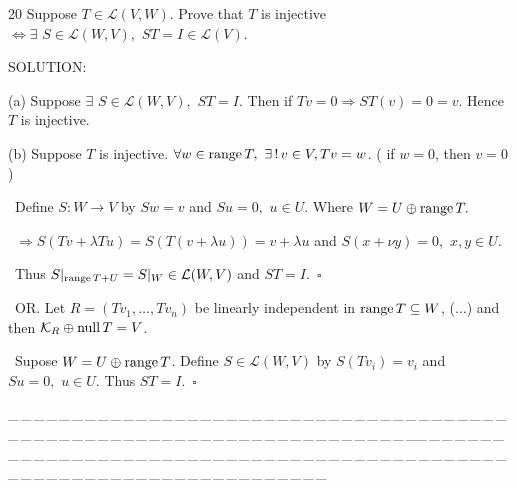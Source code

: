 \documentclass[a4paper, 11pt, UTF8]{article}
\def\range{\textup{range}\,}
\def\null{\textup{null\,}}
\def\Lm{\mathcal{L}}
\begin{document}
\begin{large}
{\timesbf\Large 20} {\timessl\Large 
Suppose $T\in\Lm(V, W)$. Prove that $T$ is injective $\Longleftrightarrow\exists\,\,S\in\Lm(W, V),\,\,ST=I\in\Lm(V)$.}\par
{\timesbf S\footnotesize{OLUTION:}}\par\quad
(a) Suppose $\exists\,\,S\in\Lm(W, V),\,\,ST=I$. Then if $Tv=0\Rightarrow ST(v)=0=v.$ Hence $T$ is injective.\par\quad
(b) Suppose $T$ is injective. $\forall w\in\range T,\,\,\exists\,!\,v\in V,Tv=w$. ( if $w=0$, then $v=0$ )\par\qquad\,
Define $S:W\rightarrow V$ by $Sw=v$ and $Su=0,\,\,u\in U$. Where $W=U\oplus\range T.$\par\qquad\,
$\Rightarrow S(Tv+\lambda Tu)=S(T(v+\lambda u))=v+\lambda u$ and $S(x+\nu y)=0,\,\,x,y\in U$.\par\qquad\,
Thus $S|_{\range T+U}=S|_W\in\Lm(W,V)$ and $ST=I.\,\,\,\square$\par\qquad\,
{O\small R.} Let $R=(Tv_1,\dots,Tv_n)$ be linearly independent in $\range T\subseteq W$, ($\dots$) and then $\mathcal{K}_R\oplus\null T=V$.\par\qquad\,
Supose $W=U\oplus\range T$. Define $S\in\Lm(W,V)$ by $S(Tv_i)=v_i$ and $Su=0,\,\,u\in U.$ Thus $ST=I.\,\,\,\square$
\par
{\tiny \_\,\_\,\_\,\_\,\_\,\_\,\_\,\_\,\_\,\_\,\_\,\_\,\_\,\_\,\_\,\_\,\_\,\_\,\_\,\_\,\_\,\_\,\_\,\_\,\_\,\_\,\_\,\_\,\_\,\_\,\_\,\_\,\_\,\_\,\_\,\_\,\_\,\_\,\_\,\_\,\_\,\_\,\_\,\_\,\_\,\_\,\_\,\_\,\_\,\_\,\_\,\_\,\_\,\_\,\_\,\_\,\_\,\_\,\_\,\_\,\_\,\_\,\_\,\_\,\_\,\_\,\_\,\_\,\_\,\_\,\_\_\,\_\,\_\,\_\,\_\,\_\,\_\,\_\,\_\,\_\,\_\,\_\,\_\,\_\,\_\,\_\,\_\,\_\,\_\,\_\,\_\,\_\,\_\,\_\,\_\,\_\,\_\,\_\,\_\,\_\,\_\,\_\,\_\,\_\,\_\,\_\,\_\,\_\,\_\,\_\,\_\,\_\,\_\,\_\,\_\,\_\,\_\,\_\,\_\,\_\,\_\,\_\,\_\,\_\,\_\,\_\,\_\,\_\,\_\,\_\,\_\,\_\,\_\,\_\,\_\,\_\,\_\,\_\,\_\,\_\,\_}\par


\end{large}
\end{document}
